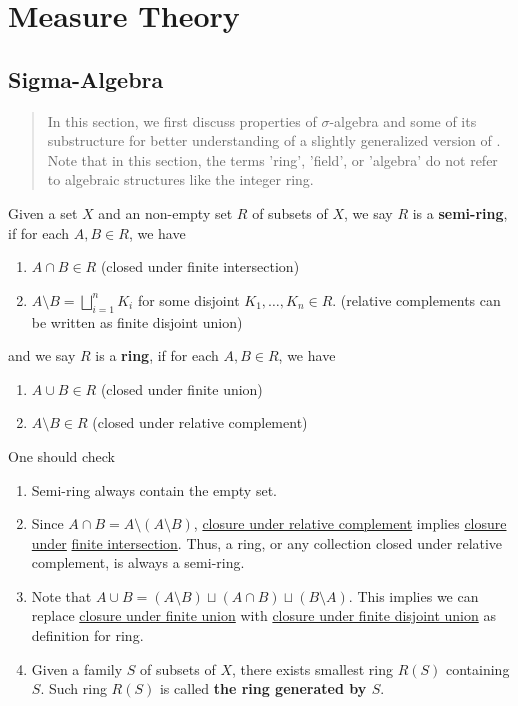 \documentclass{report}
\begin{document}
\chapter{Measure Theory}

\section{Sigma-Algebra} 
\begin{abstract}
In this section, we first discuss properties of $\sigma$-algebra and some of its substructure for better understanding of a slightly generalized version of . Note that in this section, the terms 'ring', 'field', or 'algebra' do not refer to algebraic structures like the integer ring. 
\end{abstract}
\begin{mdframed}
Given a set $X$ and an non-empty set $R$ of subsets of $X$, we say  $R$ is a \textbf{semi-ring}, if for each $A,B \in R$, we have 
\begin{enumerate}[label=(\alph*)]
  \item $A\cap B \in R$ (closed under finite intersection)
  \item  $A\setminus B=\bigsqcup_{i=1}^n K_i$ for some disjoint $K_1,\dots ,K_n \in R$. (relative complements can be written as finite disjoint union)
\end{enumerate}
and we say $R$ is a \textbf{ring}, if for each $A,B \in R$, we have 
\begin{enumerate}[label=(\alph*)]
  \item $A\cup B \in R$ (closed under finite union)
  \item $A\setminus  B \in R$ (closed under relative complement)
\end{enumerate}
One should check 
\begin{enumerate}[label=(\alph*)]
\label{c_ring}
  \item Semi-ring always contain the empty set.
\item Since $A\cap B=A\setminus (A\setminus B)$, \underline{closure under relative complement} implies \underline{closure under} \underline{finite intersection}. Thus, a ring, or any collection closed under relative complement, is always a semi-ring.
\item Note that $A\cup B=(A\setminus B)\sqcup (A\cap B) \sqcup  (B\setminus A)$. This implies we can replace  \underline{closure under finite union} with \underline{closure under finite disjoint union} as definition for ring. 
  \item Given a family $S$ of subsets of $X$, there exists smallest ring  $R(S)$ containing $S$. Such ring $R(S)$ is called \textbf{the ring generated by $S$}. 
\end{enumerate}
\end{mdframed}
\end{document}
